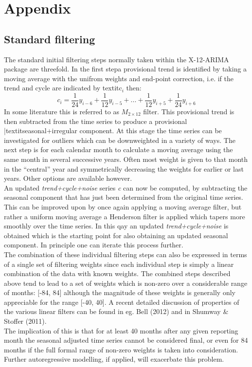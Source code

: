 \documentclass{article}
\begin{document}
\section*{Appendix}
\bigskip
\subsection*{Standard filtering}
The standard initial filtering steps normally taken within the X-12-ARIMA package are threefold. In the first stepa provisional trend is identified by taking a moving average with the unifrom weights and end-point correction, i.e. if the trend and cycle are indicated by textit{c$_i$} then:
\begin{equation*}
c_i=\frac{1}{24}y_{i-6}+\frac{1}{12}y_{i-5}+...+\frac{1}{12}y_{i+5}+\frac{1}{24}y_{i+6}
\end{equation*}
In some literature this is referred to as $M_{2\times12}$ filter. This provisional trend is then subtracted from the time series to produce a provisional |textit{seasonal+irregular} component. At this stage the time series can be investigated for outliers which can be downweighted in a variety of ways. The next step is for each calendar month to calculate a moving average using the same month in several successive years. Often most weight is given to that month in the ``central'' year and symmetrically decreasing the weights for earlier or last years. Other options are available however.\\An updated \textit{trend+cycle+noise} series \textit{c} can now be computed, by subtracting the seasonal component that has just been determined from the original time series. This can be improved upon by once again applying a moving average filter, but rather a uniform moving average a Henderson filter is applied which tapers more smoothly over the time series. In this qay an updated \textit{trend+cycle+noise} is obtained which is the starting point for also obtaining an updated seasonal component. In principle one can iterate this process further.\\The combination of these individual filtering steps can also be expressed in terms of a single set of filtering weights since each individual step is simply a linear combination of the data with known weights. The combined steps described above tend to lead to a set of weights which is non-zero over a considerable range of months: [-84, 84]
 although the magnitude of these weights is generally only appreciable for the range [-40, 40]. A recent detailed discussion of properties of the various linear filters can be found in eg. Bell (2012) and in Shumway \& Stoffer (2011).\\The implication of this is that for at least 40 months after any given reporting month the seasonal adjusted time series cannot be considered final, or even for 84 months if the full formal range of non-zero weights is taken into consideration. Further autoregressive modelling, if applied, will exacerbate this problem.\\
\end{document}
